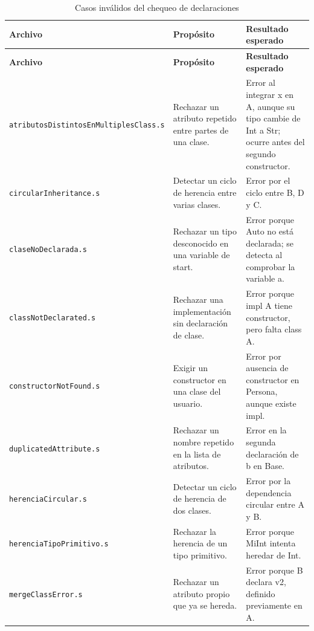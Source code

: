 \begingroup
\small
\renewcommand{\arraystretch}{1.2}
\setlength{\tabcolsep}{5pt}
\setlength{\LTleft}{0pt}
\setlength{\LTright}{0pt plus 1fill}
\begin{longtable}{|
>{\raggedright\arraybackslash}p{}|
>{\raggedright\arraybackslash}p{}|
>{\raggedright\arraybackslash}p{}|}
\caption{Casos inválidos del chequeo de declaraciones}\label{tab:declaraciones-invalidos}\\
\hline
\textbf{Archivo} & \textbf{Propósito} & \textbf{Resultado esperado} \\ \hline
\endfirsthead
\hline
\textbf{Archivo} & \textbf{Propósito} & \textbf{Resultado esperado} \\ \hline
\endhead
\texttt{atributosDistintos\allowbreak EnMultiplesClass\allowbreak .s} & Rechazar un atributo repetido entre partes de una clase. & Error al integrar x en A, aunque su tipo cambie de Int a Str; ocurre antes del segundo constructor. \\ \hline
\texttt{circularInheritance\allowbreak .s} & Detectar un ciclo de herencia entre varias clases. & Error por el ciclo entre B, D y C. \\ \hline
\texttt{claseNoDeclarada\allowbreak .s} & Rechazar un tipo desconocido en una variable de start. & Error porque Auto no está declarada; se detecta al comprobar la variable a. \\ \hline
\texttt{classNotDeclarated\allowbreak .s} & Rechazar una implementación sin declaración de clase. & Error porque impl A tiene constructor, pero falta class A. \\ \hline
\texttt{constructorNotFound\allowbreak .s} & Exigir un constructor en una clase del usuario. & Error por ausencia de constructor en Persona, aunque existe impl. \\ \hline
\texttt{duplicatedAttribute\allowbreak .s} & Rechazar un nombre repetido en la lista de atributos. & Error en la segunda declaración de b en Base. \\ \hline
\texttt{herenciaCircular\allowbreak .s} & Detectar un ciclo de herencia de dos clases. & Error por la dependencia circular entre A y B. \\ \hline
\texttt{herenciaTipoPrimitivo\allowbreak .s} & Rechazar la herencia de un tipo primitivo. & Error porque MiInt intenta heredar de Int. \\ \hline
\texttt{mergeClassError\allowbreak .s} & Rechazar un atributo propio que ya se hereda. & Error porque B declara v2, definido previamente en A. \\ \hline

\end{longtable}
